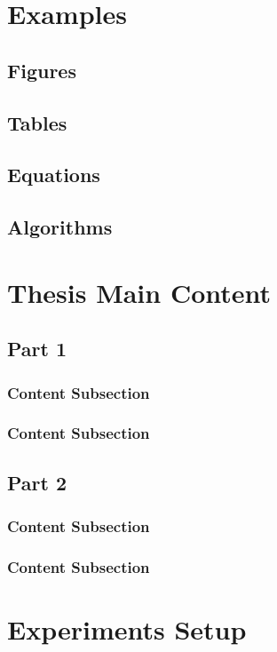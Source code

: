 \documentclass[oneside,14pt]{extarticle}
\begin{document}
	\section{Examples} 
		\subsection{Figures}  \clearpage
		\subsection{Tables}  \clearpage
		\subsection{Equations}  \clearpage
		\subsection{Algorithms}  \clearpage
	\section{Thesis Main Content} 
		\subsection{Part 1}
			\subsubsection{Content Subsection}
			\subsubsection{Content Subsection}
		\subsection{Part 2}
			\subsubsection{Content Subsection}
			\subsubsection{Content Subsection}
		\clearpage
	\section{Experiments Setup} 
\end{document}

